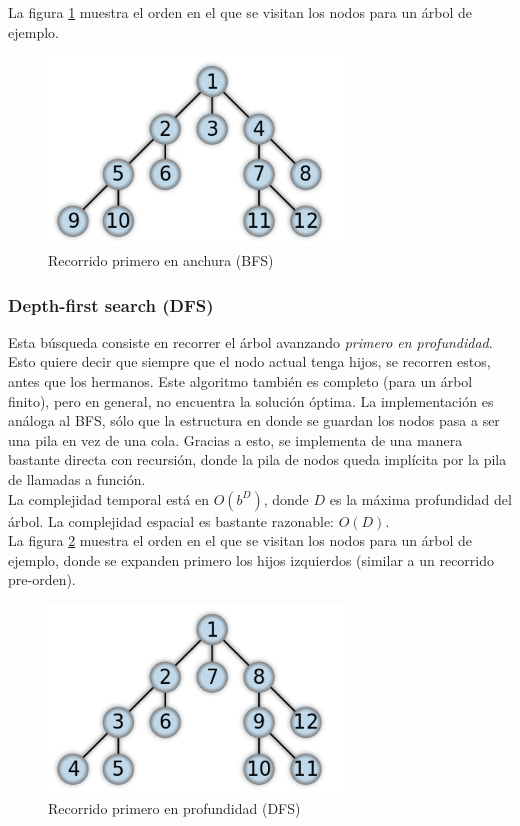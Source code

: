 \documentclass[11pt,a4paper]{article}
\begin{document}
La figura \ref{fig:BFS} muestra el orden en el que se visitan los nodos para un árbol de ejemplo. \\

{
\begin{figure}
  \centering
    \includegraphics[width=0.7\textwidth]{img/BFS}
  \caption{Recorrido primero en anchura (BFS)}
  \label{fig:BFS}
\end{figure}
}
\subsubsection{Depth-first search (DFS)}
Esta búsqueda consiste en recorrer el árbol avanzando \emph{primero en profundidad}. Esto quiere decir que siempre que el nodo actual tenga hijos, se recorren estos, antes que los hermanos. Este algoritmo también es completo (para un árbol finito), pero en general, no encuentra la solución óptima. La implementación es análoga al BFS, sólo que la estructura en donde se guardan los nodos pasa a ser una pila en vez de una cola. Gracias a esto, se implementa de una manera bastante directa con recursión, donde la pila de nodos queda implícita por la pila de llamadas a función. \\

La complejidad temporal está en $O(b^{D})$, donde $D$ es la máxima profundidad del árbol. La complejidad espacial es bastante razonable: $O(D)$. \\

La figura \ref{fig:DFS} muestra el orden en el que se visitan los nodos para un árbol de ejemplo, donde se expanden primero los hijos izquierdos (similar a un recorrido pre-orden). \\

{
\begin{figure}
  \centering
    \includegraphics[width=0.7\textwidth]{img/DFS}
  \caption{Recorrido primero en profundidad (DFS)}
  \label{fig:DFS}
\end{figure}
}
\end{document}
